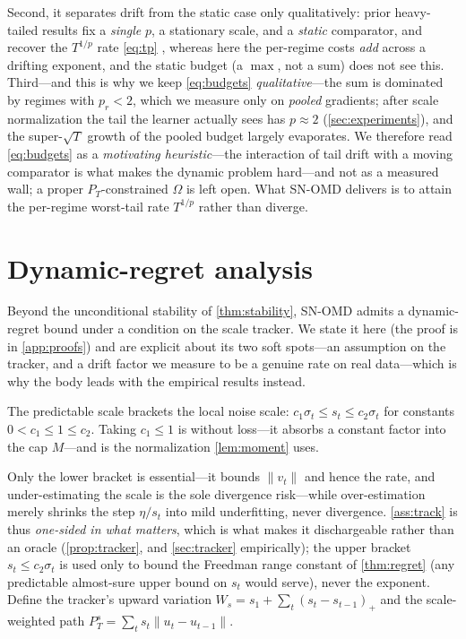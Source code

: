 \documentclass{article}
\newcommand{\norm}[1]{\lVert #1 \rVert}
\begin{document}
Second, it separates drift from the static case only qualitatively: prior heavy-tailed
results fix a \emph{single} $p$, a stationary scale, and a \emph{static} comparator, and
recover the $T^{1/p}$ rate \eqref{eq:tp} \citep{zhang2026oco,zhangcutkosky2022,bubeck2013},
whereas here the per-regime costs \emph{add} across a drifting exponent, and the static
budget (a $\max$, not a sum) does not see this. Third---and this is why we keep
\eqref{eq:budgets} \emph{qualitative}---the sum is dominated by regimes with $p_r<2$,
which we measure only on \emph{pooled} gradients; after scale normalization the tail the
learner actually sees has $p\approx2$ (\cref{sec:experiments}), and the super-$\sqrt T$
growth of the pooled budget largely evaporates. We therefore read \eqref{eq:budgets} as
a \emph{motivating heuristic}---the interaction of tail drift with a moving comparator is
what makes the dynamic problem hard---and not as a measured wall; a proper
$P_T$-constrained $\Omega$ is left open. What SN-OMD delivers is to attain the per-regime
worst-tail rate $T^{1/p}$ rather than diverge.

\section{Dynamic-regret analysis}
\label{app:regret}

Beyond the unconditional stability of \cref{thm:stability}, SN-OMD admits a dynamic-regret
bound under a condition on the scale tracker. We state it here (the proof is in
\cref{app:proofs}) and are explicit about its two soft spots---an assumption on the
tracker, and a drift factor we measure to be a genuine rate on real data---which is why
the body leads with the empirical results instead.

\begin{assumption}
\label{ass:track}
The predictable scale brackets the local noise scale: $c_1\sigma_t\le s_t\le
c_2\sigma_t$ for constants $0<c_1\le1\le c_2$. Taking $c_1\le1$ is without loss---it absorbs
a constant factor into the cap $M$---and is the normalization \cref{lem:moment} uses.
\end{assumption}
Only the lower bracket is essential---it bounds $\norm{v_t}$ and hence the rate, and
under-estimating the scale is the sole divergence risk---while over-estimation merely
shrinks the step $\eta/s_t$ into mild underfitting, never divergence. \cref{ass:track}
is thus \emph{one-sided in what matters}, which is what makes it dischargeable rather than an
oracle (\cref{prop:tracker}, and \cref{sec:tracker} empirically); the upper bracket
$s_t\le c_2\sigma_t$ is used only to bound the Freedman range constant of \cref{thm:regret}
(any predictable almost-sure upper bound on $s_t$ would serve), never the exponent. Define the tracker's upward
variation $W_s=s_1+\sum_t(s_t-s_{t-1})_+$ and the scale-weighted path
$P_T^s=\sum_t s_t\norm{u_t-u_{t-1}}$.
\end{document}
